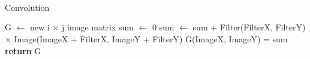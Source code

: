 \documentclass[11pt]{article}
\title{\Topic\\
}
\author{
	\SName \\ 
	\SNumber 
	\date{}
}
\begin{document}
\maketitle
\section{}

\begin{algorithm}
\caption{Convolution}
\begin{algorithmic}[1]
	\State G $\gets$ new i $\times$ j image matrix
			\State sum $\gets$ 0
					\State sum $\gets$ sum + Filter(FilterX, FilterY) $\times$ Image(ImageX + FilterX, ImageY + FilterY)
				\EndFor
			\EndFor
			\State G(ImageX, ImageY) = sum
		\EndFor
	\EndFor
	\State \textbf{return} G
\EndProcedure
\end{algorithmic}
\end{algorithm}

\end{document}
